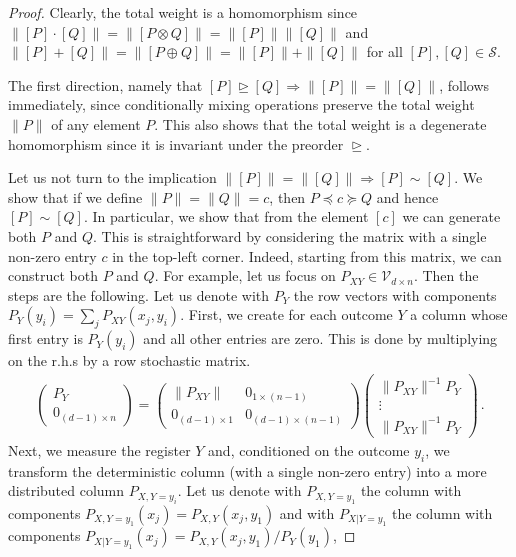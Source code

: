 \documentclass[aps,pra,11pt,onecolumn,nofootinbib,tightenlines]{revtex4-2}
\theoremstyle{definition}
\newcommand{\cS}{\mathcal{S}}
\newcommand{\V}{\mathcal{V}}
\newcommand{\rgeq}{\trianglerighteq}
\begin{document}
\begin{proof}
Clearly, the total weight is a homomorphism since $\|[P]\cdot [Q]\|=\|[P\otimes Q]\|=\|[P]\|\|[Q]\|$ and $\|[P]+[Q]\|=\|[P\oplus Q]\|=\|[P]\|+\|[Q]\|$ for all $[P],[Q]\in\cS$. 

The first direction, namely that $[P] \rgeq [Q] \Rightarrow \|[P]\| = \|[Q]\|$, follows immediately, since conditionally mixing operations preserve the total weight $\|P\|$ of any element $P$. This also shows that the total weight is a degenerate homomorphism since it is invariant under the preorder $\rgeq$.

Let us not turn to the implication $\|[P]\|=\|[Q]\|\Rightarrow [P]\sim [Q]$.  We show that if we define $\|P\|=\|Q\| = c$, then $P\preceq c\succeq Q$ 
and hence $[P]\sim [Q]$. In particular, we show that from the element $[c]$ we can generate both $P$ and $Q$. This is straightforward by considering the matrix with a single non-zero entry $c$ in the top-left corner. Indeed, starting from this matrix, we can construct both $P$ and $Q$. For example, let us focus on $P_{XY} \in \V_{d\times n}$.
Then the steps are the following. Let us denote with $P_{Y}$ the row vectors with components $P_Y(y_i) = \sum_jP_{XY}(x_j,y_i)$. 
First, we create for each outcome $Y$ a column whose first entry is $P_Y(y_i)$ and all other entries are zero. This is done by multiplying on the r.h.s by a row stochastic matrix.
\begin{align}
\begin{pmatrix}
     P_{Y} \\
    0_{(d-1) \times n}   
\end{pmatrix}=
\begin{pmatrix}
    \|P_{XY}\| & 0_{1\times (n-1)} \\
    0_{(d-1)\times 1} & 0_{(d-1)\times (n-1)}
\end{pmatrix} 
\begin{pmatrix}
    \|P_{XY}\|^{-1} P_{Y} \\
    \vdots \\
    \|P_{XY}\|^{-1} P_{Y}    
\end{pmatrix}\,.
\end{align}
Next, we measure the register $Y$ and, conditioned on the outcome $y_i$, we transform the deterministic column (with a single non-zero entry) into a more distributed column $P_{X,Y=y_i}$. Let us denote with $P_{X,Y=y_1}$ the column with components $P_{X,Y=y_1}(x_j)=P_{X,Y}(x_j,y_1)$ and with $P_{X|Y=y_1}$ the column with components $P_{X|Y=y_1}(x_j)=P_{X,Y}(x_j,y_1)/P_Y(y_1)$,

\end{proof}
\end{document}
